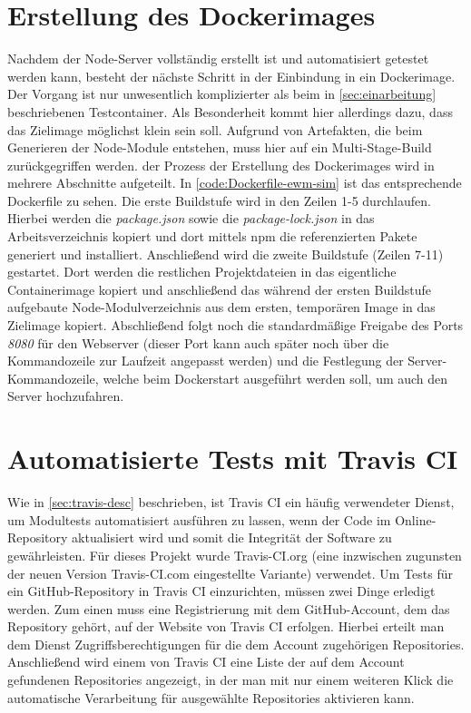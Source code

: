 \section{Erstellung des Dockerimages}
Nachdem der Node-Server vollständig erstellt ist und automatisiert getestet werden kann, besteht der nächste Schritt in der Einbindung in ein Dockerimage.
Der Vorgang ist nur unwesentlich komplizierter als beim in \autoref{sec:einarbeitung} beschriebenen Testcontainer.
Als Besonderheit kommt hier allerdings dazu, dass das Zielimage möglichst klein sein soll.
Aufgrund von Artefakten, die beim Generieren der Node-Module entstehen, muss hier auf ein Multi-Stage-Build zurückgegriffen werden.
\Dash der Prozess der Erstellung des Dockerimages wird in mehrere Abschnitte aufgeteilt.
In \autoref{code:Dockerfile-ewm-sim} ist das entsprechende Dockerfile zu sehen.
Die erste Buildstufe wird in den Zeilen 1-5 durchlaufen.
Hierbei werden die \emph{package.json} sowie die \emph{package-lock.json} in das Arbeitsverzeichnis kopiert und dort mittels \ac{npm} die referenzierten Pakete generiert und installiert.
Anschließend wird die zweite Buildstufe (Zeilen 7-11) gestartet.
Dort werden die restlichen Projektdateien in das eigentliche Containerimage kopiert und anschließend das während der ersten Buildstufe aufgebaute Node-Modulverzeichnis aus dem ersten, temporären Image in das Zielimage kopiert.
Abschließend folgt noch die standardmäßige Freigabe des Ports \emph{8080} für den Webserver (dieser Port kann auch später noch über die Kommandozeile zur Laufzeit angepasst werden) und die Festlegung der Server-Kommandozeile, welche beim Dockerstart ausgeführt werden soll, um auch den Server hochzufahren.~\cite{docker-multistage}




\section{Automatisierte Tests mit Travis CI}
Wie in \autoref{sec:travis-desc} beschrieben, ist Travis CI ein häufig verwendeter Dienst, um Modultests automatisiert ausführen zu lassen, wenn der Code im Online-Repository aktualisiert wird und somit die Integrität der Software zu gewährleisten.
Für dieses Projekt wurde Travis-CI.org (eine inzwischen zugunsten der neuen Version Travis-CI.com eingestellte Variante) verwendet.
Um Tests für ein GitHub-Repository in Travis CI einzurichten, müssen zwei Dinge erledigt werden.
Zum einen muss eine Registrierung mit dem GitHub-Account, dem das Repository gehört, auf der Website von Travis CI erfolgen.
Hierbei erteilt man dem Dienst Zugriffsberechtigungen für die dem Account zugehörigen Repositories.
Anschließend wird einem von Travis CI eine Liste der auf dem Account gefundenen Repositories angezeigt, in der man mit nur einem weiteren Klick die automatische Verarbeitung für ausgewählte Repositories aktivieren kann.

